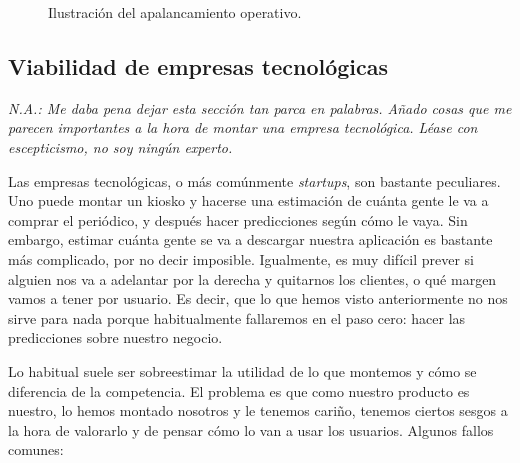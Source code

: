 \documentclass[nochap,palatino,shortheader]{apuntes}
\begin{document}
\begin{figure}[hbtp]
\caption{Ilustración del apalancamiento operativo.}
\label{fig:Apalancamiento}
\end{figure}

\subsection{Viabilidad de empresas tecnológicas}

\textit{N.A.: Me daba pena dejar esta sección tan parca en palabras. Añado cosas que me parecen importantes a la hora de montar una empresa tecnológica. Léase con escepticismo, no soy ningún experto.}

Las empresas tecnológicas, o más comúnmente \textit{startups}, son bastante peculiares. Uno puede montar un kiosko y hacerse una estimación de cuánta gente le va a comprar el periódico, y después hacer predicciones según cómo le vaya. Sin embargo, estimar cuánta gente se va a descargar nuestra aplicación es bastante más complicado, por no decir imposible. Igualmente, es muy difícil prever si alguien nos va a adelantar por la derecha y quitarnos los clientes, o qué margen vamos a tener por usuario. Es decir, que lo que hemos visto anteriormente no nos sirve para nada porque habitualmente fallaremos en el paso cero: hacer las predicciones sobre nuestro negocio.

Lo habitual suele ser sobreestimar la utilidad de lo que montemos y cómo se diferencia de la competencia. El problema es que como nuestro producto es nuestro, lo hemos montado nosotros y le tenemos cariño, tenemos ciertos sesgos a la hora de valorarlo y de pensar cómo lo van a usar los usuarios. Algunos fallos comunes:
\end{document}
